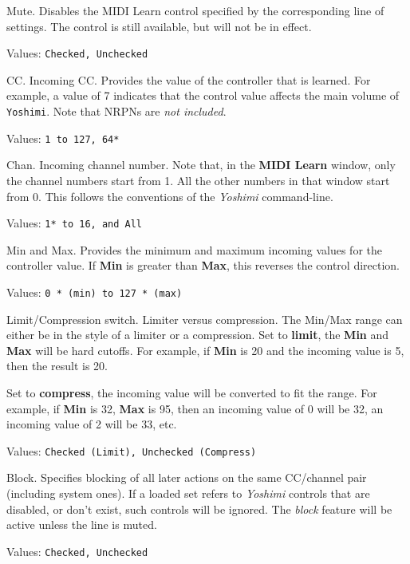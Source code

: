    Mute.
   Disables the MIDI Learn control specified by the corresponding line of
   settings.  The control is still available, but will not be in effect.

   Values: \texttt{Checked, Unchecked}

   CC.
   Incoming CC.
   Provides the value of the controller that is learned.
   For example, a value of 7 indicates that the control value affects the main
   volume of \texttt{Yoshimi}.
   Note that NRPNs are \textsl{not included}.

   Values: \texttt{1 to 127, 64*}

   Chan.
   Incoming channel number.
   Note that, in the \textbf{MIDI Learn} window, only the channel numbers start
   from 1.  All the other numbers in that window start from 0.  This
   follows the conventions of the \textsl{Yoshimi} command-line.

   Values: \texttt{1* to 16, and All}

   Min and Max.
   Provides the minimum and maximum incoming values for the controller value.
   If \textbf{Min} is greater than \textbf{Max}, this reverses the control
   direction.

   Values: \texttt{0 * (min) to 127 * (max)}

   Limit/Compression switch.
   Limiter versus compression.
   The Min/Max range can either be in the style of a limiter or a compression.
   Set to \textbf{limit}, the \textbf{Min} and \textbf{Max} will be hard cutoffs.
   For example, if \textbf{Min} is 20 and the incoming value is 5, then the
   result is 20.
   
   Set to \textbf{compress}, the incoming value will be converted to fit
   the range. For example, if \textbf{Min} is 32, \textbf{Max} is 95, then
   an incoming value of 0 will be 32, an incoming value of 2
   will be 33, etc.

   Values: \texttt{Checked (Limit), Unchecked (Compress)}

   Block.
   Specifies blocking of all later actions on the same CC/channel pair
   (including system ones).
   If a loaded set refers to \textsl{Yoshimi} controls that are disabled, or
   don't exist, such controls will be ignored.
   The \textsl{block} feature will be active unless the line is muted.

   Values: \texttt{Checked, Unchecked}

